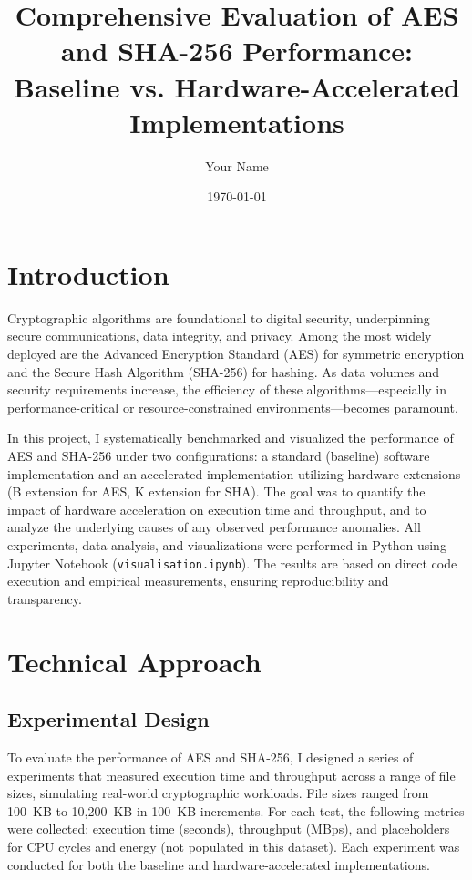 \documentclass[12pt,a4paper]{article}
\title{Comprehensive Evaluation of AES and SHA-256 Performance: Baseline vs. Hardware-Accelerated Implementations}
\author{Your Name}
\date{\today}
\begin{document}
\maketitle

\section{Introduction}
Cryptographic algorithms are foundational to digital security, underpinning secure communications, data integrity, and privacy. Among the most widely deployed are the Advanced Encryption Standard (AES) for symmetric encryption and the Secure Hash Algorithm (SHA-256) for hashing. As data volumes and security requirements increase, the efficiency of these algorithms—especially in performance-critical or resource-constrained environments—becomes paramount.

In this project, I systematically benchmarked and visualized the performance of AES and SHA-256 under two configurations: a standard (baseline) software implementation and an accelerated implementation utilizing hardware extensions (B extension for AES, K extension for SHA). The goal was to quantify the impact of hardware acceleration on execution time and throughput, and to analyze the underlying causes of any observed performance anomalies. All experiments, data analysis, and visualizations were performed in Python using Jupyter Notebook (\texttt{visualisation.ipynb}). The results are based on direct code execution and empirical measurements, ensuring reproducibility and transparency.

\section{Technical Approach}
\subsection{Experimental Design}
To evaluate the performance of AES and SHA-256, I designed a series of experiments that measured execution time and throughput across a range of file sizes, simulating real-world cryptographic workloads. File sizes ranged from 100~KB to 10,200~KB in 100~KB increments. For each test, the following metrics were collected: execution time (seconds), throughput (MBps), and placeholders for CPU cycles and energy (not populated in this dataset). Each experiment was conducted for both the baseline and hardware-accelerated implementations.
\end{document}
